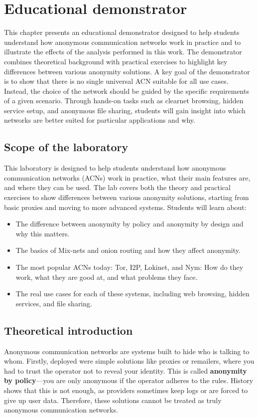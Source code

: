 \chapter{Educational demonstrator}
This chapter presents an educational demonstrator designed to help students understand how anonymous communication networks work in practice and to illustrate the effects of the analysis performed in this work. The demonstrator combines theoretical background with practical exercises to highlight key differences between various anonymity solutions.
A key goal of the demonstrator is to show that there is no single universal ACN suitable for all use cases. Instead, the choice of the network should be guided by the specific requirements of a given scenario. Through hands-on tasks such as clearnet browsing, hidden service setup, and anonymous file sharing, students will gain insight into which networks are better suited for particular applications and why.

\section{Scope of the laboratory}
This laboratory is designed to help students understand how anonymous communication networks (ACNs) work in practice, what their main features are, and where they can be used. The lab covers both the theory and practical exercises to show differences between various anonymity solutions, starting from basic proxies and moving to more advanced systems. Students will learn about:
\begin{itemize}
    \item The difference between anonymity by policy and anonymity by design and why this matters.
    \item The basics of Mix-nets and onion routing and how they affect anonymity.
    \item The most popular ACNs today: Tor, I2P, Lokinet, and Nym: How do they work, what they are good at, and what problems they face.
    \item The real use cases for each of these systems, including web browsing, hidden services, and file sharing.
\end{itemize}

\section{Theoretical introduction}
Anonymous communication networks are systems built to hide who is talking to whom. Firstly, deployed were simple solutions like proxies or remailers, where you had to trust the operator not to reveal your identity. This is called \textbf{anonymity by policy}—you are only anonymous if the operator adheres to the rules. History shows that this is not enough, as providers sometimes keep logs or are forced to give up user data. Therefore, these solutions cannot be treated as truly anonymous communication networks.

